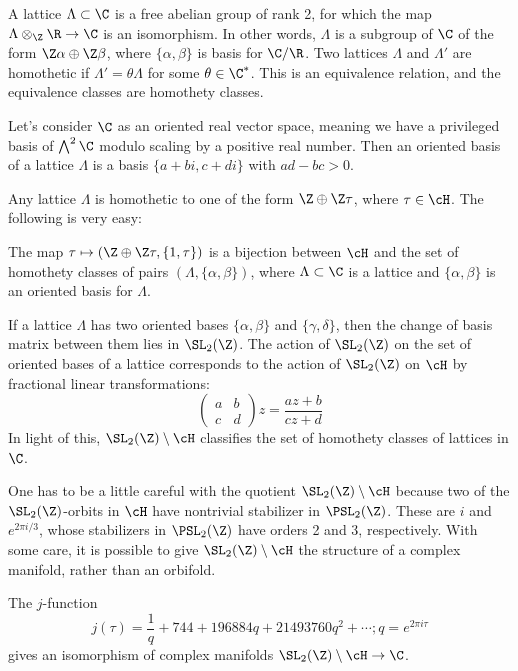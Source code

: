 A lattice $\Lambda \subset \C$ is a free abelian group of rank 2, for which the map $\Lambda \otimes_\Z \R \to \C$ is an isomorphism. In other words, $\Lambda$ is a subgroup of $\C$ of the form $\Z\alpha \oplus \Z\beta$, where $\{\alpha, \beta\}$ is basis for $\C/\R$. Two lattices $\Lambda$ and $\Lambda'$ are homothetic if $\Lambda'= \theta\Lambda$ for some $\theta \in \C^*$. This is an equivalence relation, and the equivalence classes are homothety classes.


Let’s consider $\C$ as an oriented real vector space, meaning we have a privileged basis of $\bigwedge^2 \C$ modulo scaling by a positive real number. Then an oriented basis of a lattice $\Lambda$ is a basis $\{a + bi, c + di\}$ with $ad - bc > 0$.


Any lattice $\Lambda$ is homothetic to one of the form $\Z \oplus \Z\tau$, where $\tau \in \cH$. The following is very easy:


\begin{prop} %
The map $\tau \mapsto (\Z \oplus \Z\tau, \{1,\tau\})$ is a bijection between $\cH$ and the set of homothety classes of pairs $(\Lambda,\{\alpha,\beta\})$, where $\Lambda \subset \C$ is a lattice and $\{\alpha,\beta\}$ is an oriented basis for $\Lambda$. 
\end{prop}


If a lattice $\Lambda$ has two oriented bases $\{\alpha,\beta\}$ and $\{\gamma,\delta\}$, then the change of basis matrix between them lies in $\SL_2(\Z)$. The action of $\SL_2(\Z)$ on the set of oriented bases of a lattice corresponds to the action of $\SL_2(\Z)$ on $\cH$ by fractional linear transformations: 
	\[
	\begin{pmatrix} a & b \\ c & d \end{pmatrix} z= \dfrac{az + b}{cz + d}
	\]
In light of this, $\SL_2(\Z) \setminus \cH$ classifies the set of homothety classes of lattices in $\C$.


One has to be a little careful with the quotient $\SL_2(\Z) \setminus \cH$ because two of the $\SL_2(\Z)$-orbits in $\cH$ have nontrivial stabilizer in $\PSL_2(\Z)$. These are $i$ and $e^{2\pi i/3}$, whose stabilizers in $\PSL_2(\Z)$ have orders 2 and 3, respectively. With some care, it is possible to give $\SL_2(\Z) \setminus \cH$ the structure of a complex manifold, rather than an orbifold. 


\begin{prop} %
The $j$-function
	\[
	j(\tau)= \dfrac{1}{q} + 744 + 196884q + 21493760q^2 + \cdots; q= e^{2\pi i \tau}
	\]
gives an isomorphism of complex manifolds $\SL_2(\Z) \setminus \cH \to \C$. 
\end{prop}


